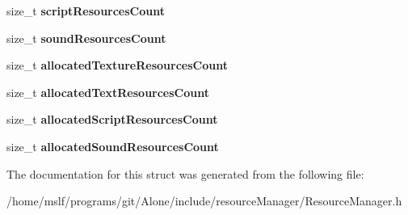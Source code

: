 \begin{DoxyCompactItemize}
size\+\_\+t {\bfseries script\+Resources\+Count}
\item 
\hypertarget{struct_resource_manager_ab954cc6c43743c2c3826407b6ada7b20}{}\label{struct_resource_manager_ab954cc6c43743c2c3826407b6ada7b20} 
size\+\_\+t {\bfseries sound\+Resources\+Count}
\item 
\hypertarget{struct_resource_manager_a4473def59a0338584d4d4c466105db47}{}\label{struct_resource_manager_a4473def59a0338584d4d4c466105db47} 
size\+\_\+t {\bfseries allocated\+Texture\+Resources\+Count}
\item 
\hypertarget{struct_resource_manager_ae61b0771d13aaa72c035c5d306578b7d}{}\label{struct_resource_manager_ae61b0771d13aaa72c035c5d306578b7d} 
size\+\_\+t {\bfseries allocated\+Text\+Resources\+Count}
\item 
\hypertarget{struct_resource_manager_a6f8a119859b5b46cd03ebffbe4385c87}{}\label{struct_resource_manager_a6f8a119859b5b46cd03ebffbe4385c87} 
size\+\_\+t {\bfseries allocated\+Script\+Resources\+Count}
\item 
\hypertarget{struct_resource_manager_a0b32bb32a73ee0fac79dee341bbb91c3}{}\label{struct_resource_manager_a0b32bb32a73ee0fac79dee341bbb91c3} 
size\+\_\+t {\bfseries allocated\+Sound\+Resources\+Count}
\end{DoxyCompactItemize}


The documentation for this struct was generated from the following file\+:\begin{DoxyCompactItemize}
\item 
/home/mslf/programs/git/\+Alone/include/resource\+Manager/Resource\+Manager.\+h\end{DoxyCompactItemize}
